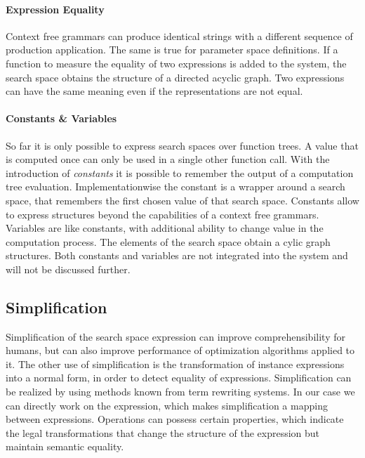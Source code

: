 \documentclass[english]{article}
\begin{document}
\paragraph{Expression Equality}
Context free grammars can produce identical strings with a different sequence of production application. The same is true for parameter space definitions.
If a function to measure the equality of two expressions is added to the system, the search space obtains the structure of a directed acyclic graph.
Two expressions can have the same meaning even if the representations are not equal.

\paragraph{Constants \& Variables}
So far it is only possible to express search spaces over function trees.
A value that is computed once can only be used in a single other function call. With the introduction of \textit{constants} it is possible to remember the output of a computation tree evaluation. Implementationwise the constant is a wrapper around a search space, that remembers the first chosen value of that search space. Constants allow to express structures beyond the capabilities of a context free grammars. Variables are like constants, with additional ability to change value in the computation process. The elements of the search space obtain a cylic graph structures. Both constants and variables are not integrated into the system and will not be discussed further.

\subsection{Simplification}
Simplification of the search space expression can improve comprehensibility for humans, but can also improve performance of optimization algorithms applied to it. The other use of simplification is the transformation of instance expressions into a normal form, in order to detect equality of expressions.
Simplification can be realized by using methods known from term rewriting systems. In our case we can directly work on the expression, which makes simplification a mapping between expressions.
Operations can possess certain properties, which indicate the legal transformations that change the structure of the expression but maintain semantic equality.
\end{document}
